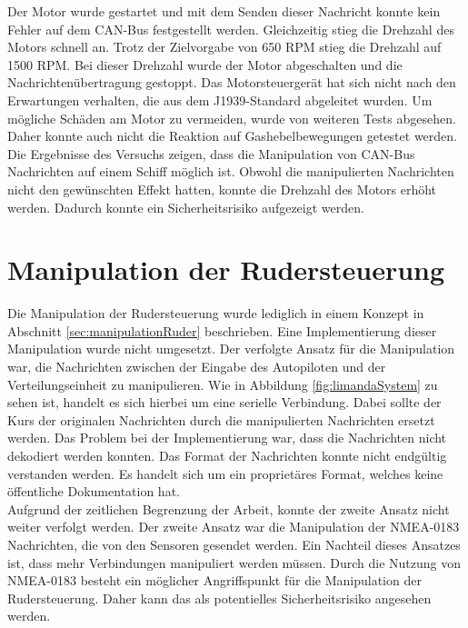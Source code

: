 Der Motor wurde gestartet und mit dem
Senden dieser Nachricht konnte kein Fehler auf dem CAN-Bus festgestellt werden. Gleichzeitig stieg die Drehzahl des Motors
schnell an. Trotz der Zielvorgabe von 650 RPM stieg die Drehzahl auf 1500 RPM. Bei dieser Drehzahl wurde der
Motor abgeschalten und die Nachrichtenübertragung gestoppt. Das Motorsteuergerät hat sich nicht nach den Erwartungen verhalten,
die aus dem J1939-Standard abgeleitet wurden. Um mögliche Schäden am Motor zu vermeiden, wurde von weiteren Tests abgesehen.
Daher konnte auch nicht die Reaktion auf Gashebelbewegungen getestet werden. \\
Die Ergebnisse des Versuchs zeigen, dass die Manipulation von CAN-Bus Nachrichten auf einem Schiff möglich ist.
Obwohl die manipulierten Nachrichten nicht den gewünschten Effekt hatten, konnte die Drehzahl des Motors erhöht werden.
Dadurch konnte ein Sicherheitsrisiko aufgezeigt werden. 

\section{Manipulation der Rudersteuerung}

Die Manipulation der Rudersteuerung wurde lediglich in einem Konzept in Abschnitt \ref{sec:manipulationRuder} beschrieben.
Eine Implementierung dieser Manipulation wurde nicht umgesetzt. 
Der verfolgte Ansatz für die Manipulation war, die Nachrichten zwischen der Eingabe des Autopiloten und der 
Verteilungseinheit zu manipulieren. Wie in Abbildung \ref{fig:limandaSystem} zu sehen ist, handelt es sich hierbei um eine 
serielle Verbindung.
Dabei sollte der Kurs der originalen Nachrichten durch die manipulierten Nachrichten
ersetzt werden. Das Problem bei der Implementierung war, dass die Nachrichten nicht dekodiert werden konnten. 
Das Format der Nachrichten konnte nicht endgültig verstanden werden. Es handelt sich um ein proprietäres Format,
welches keine öffentliche Dokumentation hat. \\
Aufgrund der zeitlichen Begrenzung der Arbeit, konnte der zweite Ansatz nicht weiter verfolgt werden. 
Der zweite Ansatz war die Manipulation der NMEA-0183 Nachrichten, die von den Sensoren gesendet werden.
Ein Nachteil dieses Ansatzes ist, dass mehr Verbindungen manipuliert werden müssen.
Durch die Nutzung von NMEA-0183 besteht ein möglicher Angriffspunkt für die Manipulation der Rudersteuerung.
Daher kann das als potentielles Sicherheitsrisiko angesehen werden.
